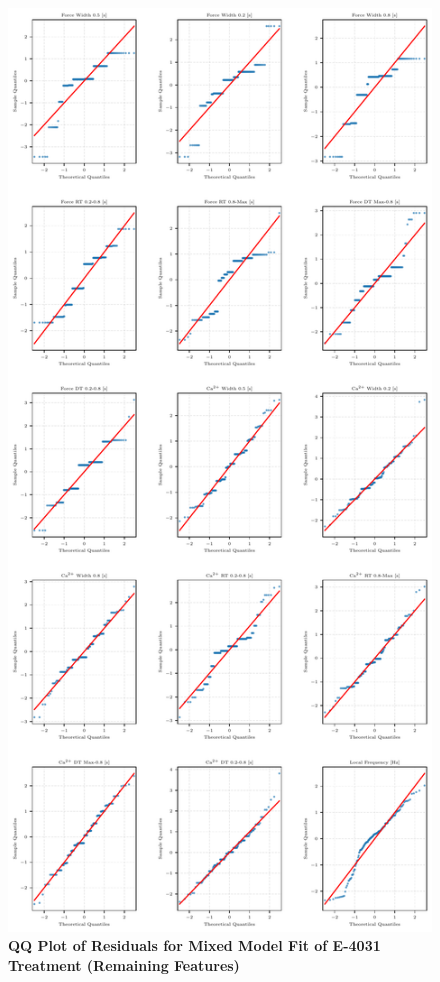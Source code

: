 \documentclass{report}
\begin{document}
    \begin{figure}
        \centering
        \includegraphics[width=1\textwidth, height=0.99\textheight, keepaspectratio]{plots/chapter_5/e4031/qq_mixed_subset_15.pdf}
        \caption[QQ Plot of Residuals for Mixed Model Fit of E-4031 Treatment (Remaining Features)]{\textbf{QQ Plot of Residuals for Mixed Model Fit of E-4031 Treatment (Remaining Features)}}
        \label{fig:e4031-remaining-qq}
    \end{figure}
\end{document}
